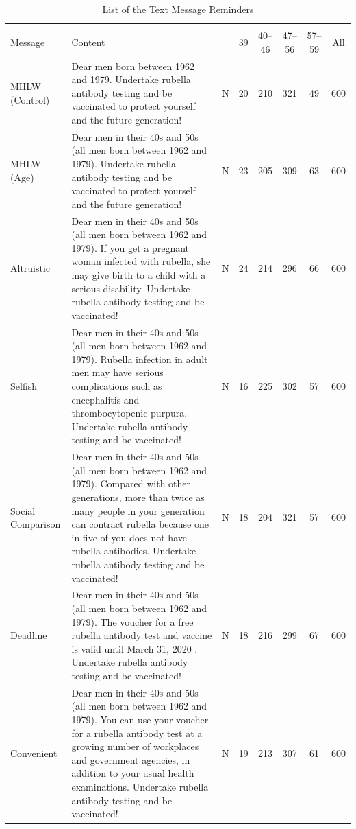 \documentclass[
  11pt,
  a4paper
]{article}
\begin{document}
\begin{table}

\caption{\label{tab:message-list}List of the Text Message Reminders}
\centering
\fontsize{9}{11}\selectfont
\begin{tabular}[t]{l>{\raggedright\arraybackslash}p{20em}cccccc}
\toprule
\multicolumn{3}{c}{ } & \multicolumn{4}{c}{Age (as of April 2019)} & \multicolumn{1}{c}{ } \\
\cmidrule(l{3pt}r{3pt}){4-7}
Message & Content &   & 39 & 40--46 & 47--56 & 57--59 & All\\
\midrule
MHLW (Control) & Dear men born between 1962 and 1979. Undertake rubella antibody testing and be vaccinated to protect yourself and the future generation! & N & 20 & 210 & 321 & 49 & 600\\
\addlinespace
MHLW (Age) & Dear men in their 40s and 50s (all men born between 1962 and 1979). Undertake rubella antibody testing and be vaccinated to protect yourself and the future generation! & N & 23 & 205 & 309 & 63 & 600\\
\addlinespace
Altruistic & Dear men in their 40s and 50s (all men born between 1962 and 1979). If you get a pregnant woman infected with rubella, she may give birth to a child with a serious disability. Undertake rubella antibody testing and be vaccinated! & N & 24 & 214 & 296 & 66 & 600\\
\addlinespace
Selfish & Dear men in their 40s and 50s (all men born between 1962 and 1979). Rubella infection in adult men may have serious complications such as encephalitis and thrombocytopenic purpura. Undertake rubella antibody testing and be vaccinated! & N & 16 & 225 & 302 & 57 & 600\\
\addlinespace
Social Comparison & Dear men in their 40s and 50s (all men born between 1962 and 1979). Compared with other generations, more than twice as many people in your generation can contract rubella because one in five of you does not have rubella antibodies. Undertake rubella antibody testing and be vaccinated! & N & 18 & 204 & 321 & 57 & 600\\
\addlinespace
Deadline & Dear men in their 40s and 50s (all men born between 1962 and 1979). The voucher for a free rubella antibody test and vaccine is valid until March 31, 2020 . Undertake rubella antibody testing and be vaccinated! & N & 18 & 216 & 299 & 67 & 600\\
\addlinespace
Convenient & Dear men in their 40s and 50s (all men born between 1962 and 1979). You can use your voucher for a rubella antibody test at a growing number of workplaces and government agencies, in addition to your usual health examinations. Undertake rubella antibody testing and be vaccinated! & N & 19 & 213 & 307 & 61 & 600\\
\bottomrule
\end{tabular}
\end{table}
\end{document}
